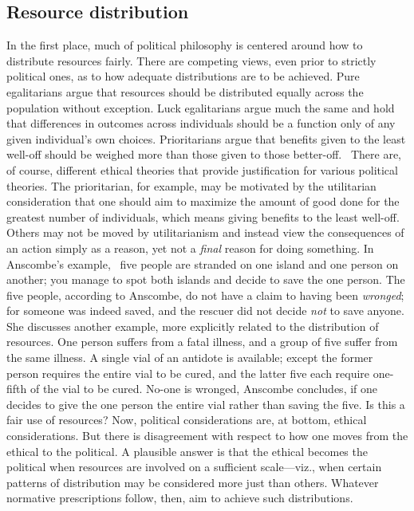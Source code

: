 \subsection{Resource distribution}
In the first place, much of political philosophy is centered around how to distribute resources fairly. There are competing views, even prior to strictly political ones, as to how adequate distributions are to be achieved. Pure egalitarians argue that resources should be distributed equally across the population without exception. Luck egalitarians argue much the same and hold that differences in outcomes across individuals should be a function only of any given individual’s own choices. Prioritarians argue that benefits given to the least well-off should be weighed more than those given to those better-off.~\citep{Parfit(1997)} There are, of course, different ethical theories that provide justification for various political theories. The prioritarian, for example, may be motivated by the utilitarian consideration that one should aim to maximize the amount of good done for the greatest number of individuals, which means giving benefits to the least well-off. Others may not be moved by utilitarianism and instead view the consequences of an action simply as a reason, yet not a \emph{final} reason for doing something. In Anscombe’s example,~\citep{Anscombe(1967)} five people are stranded on one island and one person on another; you manage to spot both islands and decide to save the one person. The five people, according to Anscombe, do not have a claim to having been \emph{wronged}; for someone was indeed saved, and the rescuer did not decide \emph{not} to save anyone. She discusses another example, more explicitly related to the distribution of resources. One person suffers from a fatal illness, and a group of five suffer from the same illness. A single vial of an antidote is available; except the former person requires the entire vial to be cured, and the latter five each require one-fifth of the vial to be cured. No-one is wronged, Anscombe concludes, if one decides to give the one person the entire vial rather than saving the five. Is this a fair use of resources? Now, political considerations are, at bottom, ethical considerations. But there is disagreement with respect to how one moves from the ethical to the political. A plausible answer is that the ethical becomes the political when resources are involved on a sufficient scale---viz., when certain patterns of distribution may be considered more just than others. Whatever normative prescriptions follow, then, aim to achieve such distributions.


